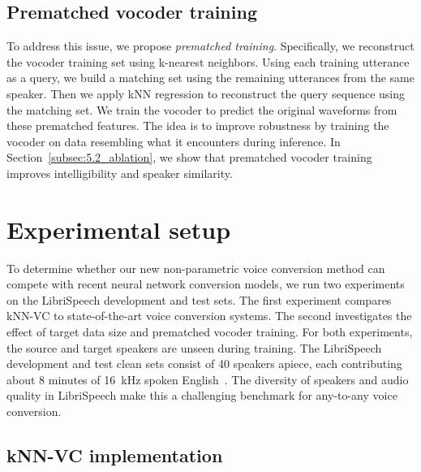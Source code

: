 \documentclass{INTERSPEECH2023}
\def\modelname{{kNN-VC}}
\begin{document}
\subsection{Prematched vocoder training}
\label{sec:3_prematching}


To address this issue, we propose \textit{prematched training}.
Specifically, we reconstruct the vocoder training set using k-nearest neighbors.
Using each training utterance as a query, we build a matching set using the remaining utterances from the same speaker.
Then we apply kNN regression to reconstruct the query sequence using the matching set.
We train the vocoder to predict the original waveforms from these prematched features.
The idea is to improve robustness by training the vocoder on data resembling what it encounters during inference.
In Section~\ref{subsec:5.2_ablation}, we show that prematched vocoder training improves intelligibility and speaker similarity. 



\section{Experimental setup}


To determine whether our new non-parametric voice conversion method can compete with recent neural network 
conversion models, we run two experiments on the LibriSpeech development and test sets.
The first experiment compares kNN-VC to state-of-the-art voice conversion systems.
The second investigates the effect of target data size and prematched vocoder training.
For both experiments, the source and target speakers are unseen during training.
The LibriSpeech development and test clean sets consist of 40 speakers apiece, each contributing about 8 minutes of 16~kHz spoken English~\cite{panayotov2015librispeech}.
The diversity of speakers and audio quality in LibriSpeech make this a challenging benchmark for any-to-any voice conversion.

\subsection{\modelname{} implementation}
\end{document}
